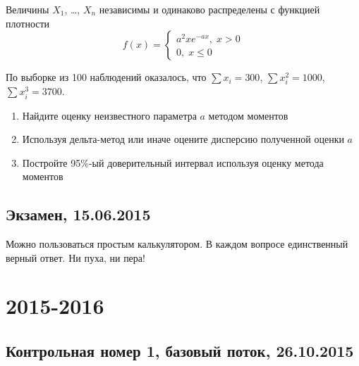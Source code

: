 \documentclass[12pt, a4paper]{article}\usepackage[]{graphicx}\usepackage[]{color}
\begin{document}
				Величины $X_1$, \ldots, $X_n$ независимы и одинаково распределены с функцией плотности
				\[
				f(x)=\begin{cases}
				a^2xe^{-ax}, \; x>0 \\
				0, \; x\leq 0
				\end{cases}
				\]

				По выборке из 100 наблюдений оказалось, что $\sum x_i =300$, $\sum x_i^2=1000$, $\sum x_i^3=3700$.

				\begin{enumerate}
					\item Найдите оценку неизвестного параметра $a$ методом моментов
					\item Используя дельта-метод или иначе оцените дисперсию полученной оценки $a$
					\item Постройте 95\%-ый доверительный интервал используя оценку метода моментов
				\end{enumerate}


				\subsection{Экзамен, 15.06.2015}

				

				\vspace{3ex}

				Можно пользоваться простым калькулятором.  В каждом вопросе единственный верный ответ. Ни пуха, ни пера!

				\vspace{3ex}




				\section{2015-2016}




				\subsection{Контрольная номер 1, базовый поток, 26.10.2015}
\end{document}
